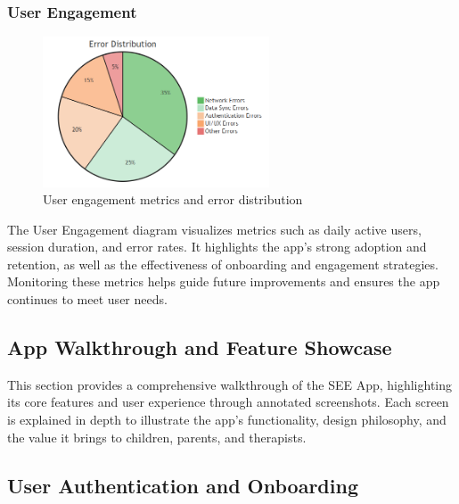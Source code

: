 \documentclass[12pt,a4paper]{article}
\newcommand{\sectiontitle}[1]{\subsection{#1}}
\newcommand{\subsectiontitle}[1]{\subsubsection{#1}}
\begin{document}
\subsectiontitle{User Engagement}

\begin{figure}[H]
    \centering
    \includegraphics[width=0.6\textwidth,height=0.14\textwidth,keepaspectratio]{redrawn_diagrams/Figure10_User_Engagement.png}
    \caption{User engagement metrics and error distribution}
    \label{fig:user-engagement}
\end{figure}
\vspace{0.5em}
The User Engagement diagram visualizes metrics such as daily active users, session duration, and error rates. It highlights the app's strong adoption and retention, as well as the effectiveness of onboarding and engagement strategies. Monitoring these metrics helps guide future improvements and ensures the app continues to meet user needs.

\newpage

\sectiontitle{App Walkthrough and Feature Showcase}

This section provides a comprehensive walkthrough of the SEE App, highlighting its core features and user experience through annotated screenshots. Each screen is explained in depth to illustrate the app's functionality, design philosophy, and the value it brings to children, parents, and therapists.

\sectiontitle{User Authentication and Onboarding}
\end{document}
